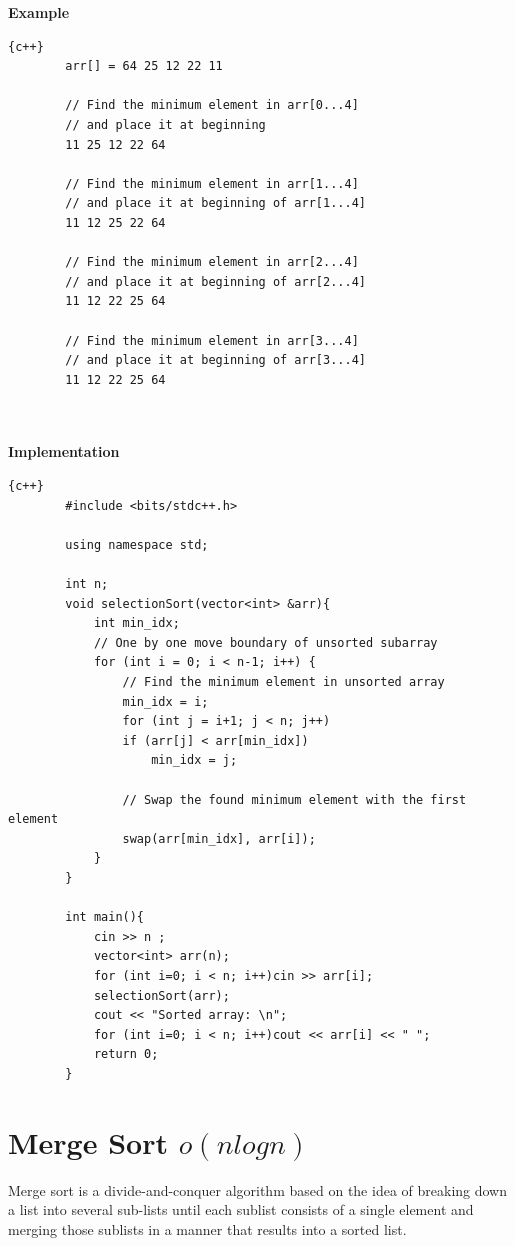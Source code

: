 \textbf{{\Large{Example}}}
\begin{lstlisting}{c++}
        arr[] = 64 25 12 22 11
        
        // Find the minimum element in arr[0...4]
        // and place it at beginning
        11 25 12 22 64
        
        // Find the minimum element in arr[1...4]
        // and place it at beginning of arr[1...4]
        11 12 25 22 64
        
        // Find the minimum element in arr[2...4]
        // and place it at beginning of arr[2...4]
        11 12 22 25 64
        
        // Find the minimum element in arr[3...4]
        // and place it at beginning of arr[3...4]
        11 12 22 25 64 

\end{lstlisting}
\\
\\
\newline\newline
\textbf{{\Large{Implementation}}}
\begin{lstlisting}{c++}
        #include <bits/stdc++.h>
        
        using namespace std;
        
        int n;
        void selectionSort(vector<int> &arr){
        	int min_idx;
        	// One by one move boundary of unsorted subarray
        	for (int i = 0; i < n-1; i++) {
        		// Find the minimum element in unsorted array
        		min_idx = i;
        		for (int j = i+1; j < n; j++)
        		if (arr[j] < arr[min_idx])
        			min_idx = j;
        
        		// Swap the found minimum element with the first element
        		swap(arr[min_idx], arr[i]);
        	}
        }
        
        int main(){
            cin >> n ;
        	vector<int> arr(n);
        	for (int i=0; i < n; i++)cin >> arr[i];
        	selectionSort(arr);
        	cout << "Sorted array: \n";
        	for (int i=0; i < n; i++)cout << arr[i] << " ";
        	return 0;
        }
\end{lstlisting}

\newpage





\section{Merge Sort $o(nlogn)$}
Merge sort is a divide-and-conquer algorithm based on the idea of breaking down a list into several sub-lists until each sublist consists of a single element and merging those sublists in a manner that results into a sorted list.\newline

